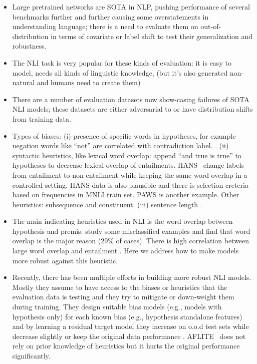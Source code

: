 
\begin{itemize}
    \item Large pretrained networks are SOTA in NLP,
    pushing performance of several benchmarks further and further causing some overstatements in understanding language; there is a need to evaluate them on out-of-distribution in terms of covariate or label shift to test their generalization and robustness.
    
    \item The NLI task is very popular for these kinds of evaluation: it is easy to model, needs all kinds of linguistic knowledge, (but it's also generated non-natural and humans need to create them)
    
    \item There are a number of evaluation datasets now show-casing failures of SOTA NLI models; these datasets are either adversarial to or have distribution shifts from
    training data. 
    
    \item Types of biases: 
    (i) presence of specific words in hypotheses, for example negation words like ``not'' are correlated with contradiction label. 
    \cite{naik2018stress,gururangan2018annotation}.
    (ii) syntactic heuristics, like lexical word overlap:  append ``and true is true'' to hypotheses to  decrease lexical overlap of entailments. HANS~\citep{linzen2019right} change labels from entailment to non-entailment while
    keeping the same word-overlap in a controlled setting.
    HANS data is also plausible and there is selection
    creteria based on frequencies in MNLI train set.
    PAWS is another example.
    Other heuristics: subsequence and constituent. 
    (iii) sentence length \cite{gururangan2018annotation}.
    
    
    \item The main indicating heuristics used in NLI is the word overlap between hypothesis and premis.  study some misclassified examples and find that word overlap is the major reason (29\% of cases). There is high correlation between large word overlap and entailment \cite{linzen2019right}.
    Here we address how to make models more robust against this heuristic.  
    
    \item Recently, there has been multiple efforts in building more robust NLI models. Mostly they assume to
    have access to the biases or heuristics that the evaluation data is testing and they try to mitigate or down-weight them during training. They design suitable bias  models (e.g., models with hypothesis only) for each known bias (e.g., hypothesis standalone features) and by learning a residual target model they 
    increase on o.o.d test sets while decrease slightly \cite{clark2019dont,he2019unlearn,mahabadi2019simple,utama2020mind} or keep the original data performance \cite{utama2020mind}.
    AFLITE~\citep{bras2020adversarial} does not rely on prior knowledge of heuristics but it hurts the original performance significantly.
    

\end{itemize}
